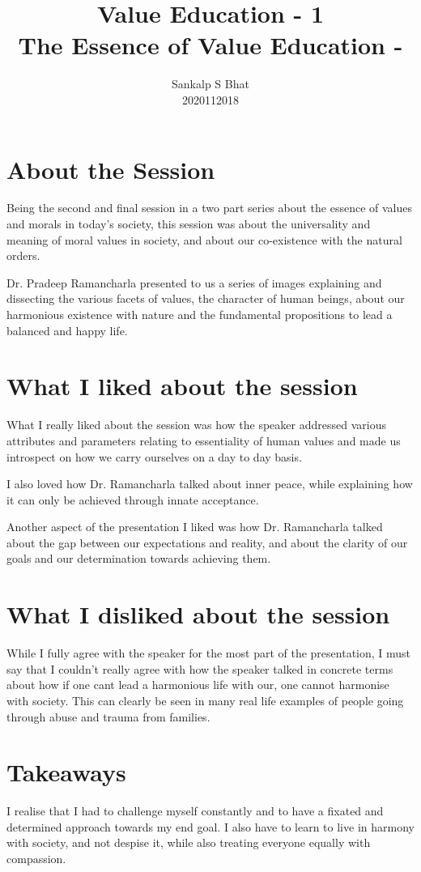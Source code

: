 \documentclass[a4paper, 12pt]{extarticle}
\title{Value Education - 1\\
The Essence of Value Education - \uppercase\expandafter{\romannumeral2\relax}}
\author{Sankalp S Bhat\\
2020112018
}
\begin{document}
\maketitle
\thispagestyle{empty}

\section*{About the Session}

Being the second and final session in a two part series about the essence of values and morals in today's society, this session was about the universality and meaning of moral values in society, and about our co-existence with the natural orders.

Dr. Pradeep Ramancharla presented to us a series of images explaining and dissecting the various facets of values, the character of human beings, about our harmonious existence with nature and the fundamental propositions to lead a balanced and happy life.
      
\section*{What I liked about the session}

What I really liked about the session was how the speaker addressed various attributes and parameters relating to essentiality of human values and made us introspect on how we carry ourselves on a day to day basis.
    
I also loved how Dr. Ramancharla talked about inner peace, while explaining how it can only be achieved through innate acceptance.

Another aspect of the presentation I liked was how Dr. Ramancharla talked about the gap between our expectations and reality, and about the clarity of our goals and our determination towards achieving them.

\section*{What I disliked about the session}
 
While I fully agree with the speaker for the most part of the presentation, I must say that I couldn't really agree with how the speaker talked in concrete terms about how if one cant lead a harmonious life with our, one cannot harmonise with society. This can clearly be seen in many real life examples of people going through abuse and trauma from families.

\section*{Takeaways}
    
I realise that I had to challenge myself constantly and to have a fixated and determined approach towards my end goal. I also have to learn to live in harmony with society, and not despise it, while also treating everyone equally with compassion.
\end{document}
